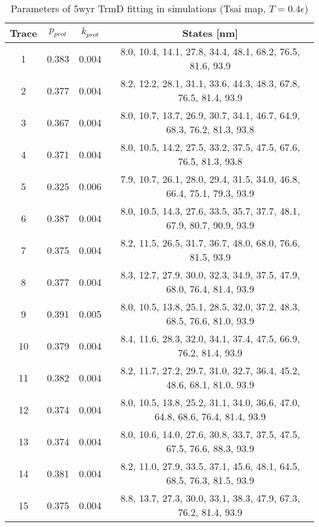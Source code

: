 \begin{table}
    \tiny
    \centering
    \caption{Parameters of 5wyr TrmD fitting in simulations (Tsai map, $T=0.4\epsilon$)}
    \label{tab:5wyr-pc-parameters}
    \begin{tabular}{c|c|c|c}
        \textbf{Trace} & \textbf{$p_{prot}$} & \textbf{$k_{prot}$} & \textbf{States [nm]}\\\hline
        1 & 0.383 & 0.004 & 8.0, 10.4, 14.1, 27.8, 34.4, 48.1, 68.2, 76.5, 81.6, 93.9\\
        2 & 0.377 & 0.004 & 8.2, 12.2, 28.1, 31.1, 33.6, 44.3, 48.3, 67.8, 76.5, 81.4, 93.9\\
        3 & 0.367 & 0.004 & 8.0, 10.7, 13.7, 26.9, 30.7, 34.1, 46.7, 64.9, 68.3, 76.2, 81.3, 93.8\\
        4 & 0.371 & 0.004 & 8.0, 10.5, 14.2, 27.5, 33.2, 37.5, 47.5, 67.6, 76.5, 81.3, 93.8\\
        5 & 0.325 & 0.006 & 7.9, 10.7, 26.1, 28.0, 29.4, 31.5, 34.0, 46.8, 66.4, 75.1, 79.3, 93.9\\
        6 & 0.387 & 0.004 & 8.0, 10.5, 14.3, 27.6, 33.5, 35.7, 37.7, 48.1, 67.9, 80.7, 90.9, 93.9\\
        7 & 0.375 & 0.004 & 8.2, 11.5, 26.5, 31.7, 36.7, 48.0, 68.0, 76.6, 81.5, 93.9\\
        8 & 0.377 & 0.004 & 8.3, 12.7, 27.9, 30.0, 32.3, 34.9, 37.5, 47.9, 68.0, 76.4, 81.4, 93.9\\
        9 & 0.391 & 0.005 & 8.0, 10.5, 13.8, 25.1, 28.5, 32.0, 37.2, 48.3, 68.5, 76.6, 81.0, 93.9\\
        10 & 0.379 & 0.004 & 8.4, 11.6, 28.3, 32.0, 34.1, 37.4, 47.5, 66.9, 76.2, 81.4, 93.9\\
        11 & 0.382 & 0.004 & 8.2, 11.7, 27.2, 29.7, 31.0, 32.7, 36.4, 45.2, 48.6, 68.1, 81.0, 93.9\\
        12 & 0.374 & 0.004 & 8.0, 10.5, 13.8, 25.2, 31.1, 34.0, 36.6, 47.0, 64.8, 68.6, 76.4, 81.4, 93.9\\
        13 & 0.374 & 0.004 & 8.0, 10.6, 14.0, 27.6, 30.8, 33.7, 37.5, 47.5, 67.5, 76.6, 88.3, 93.9\\
        14 & 0.381 & 0.004 & 8.2, 11.0, 27.9, 33.5, 37.1, 45.6, 48.1, 64.5, 68.5, 76.3, 81.5, 93.9\\
        15 & 0.375 & 0.004 & 8.8, 13.7, 27.3, 30.0, 33.1, 38.3, 47.9, 67.3, 76.2, 81.4, 93.9\\
    \end{tabular}
\end{table}

